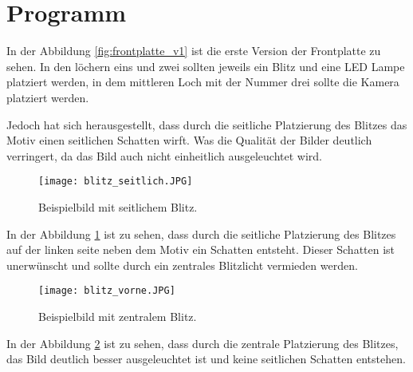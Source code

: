 \graphicspath{{images/mechanics}}

\section{Programm}

In der Abbildung \ref{fig:frontplatte_v1} ist die erste Version der Frontplatte zu sehen.
In den löchern eins und zwei sollten jeweils ein Blitz und eine LED Lampe platziert werden,
in dem mittleren Loch mit der Nummer drei sollte die Kamera platziert werden.


Jedoch hat sich herausgestellt, dass durch die seitliche Platzierung des Blitzes
das Motiv einen seitlichen Schatten wirft. Was die Qualität der Bilder deutlich verringert,
da das Bild auch nicht einheitlich ausgeleuchtet wird.

\newpage
\begin{figure}[H]
    \centering
    \texttt{[image: blitz\_seitlich.JPG]}
    \caption{Beispielbild mit seitlichem Blitz.}
    \label{fig:seitlicher_blitzt}
\end{figure}

In der Abbildung \ref{fig:seitlicher_blitzt} ist zu sehen, dass durch die seitliche Platzierung des Blitzes 
auf der linken seite neben dem Motiv ein Schatten entsteht. Dieser Schatten ist unerwünscht und sollte
durch ein zentrales Blitzlicht vermieden werden.

\begin{figure}[H]
    \centering
    \texttt{[image: blitz\_vorne.JPG]}
    \caption{Beispielbild mit zentralem Blitz.}
    \label{fig:zentraler_blitz}
\end{figure}

In der Abbildung \ref{fig:zentraler_blitz} ist zu sehen, dass durch die zentrale Platzierung des Blitzes,
das Bild deutlich besser ausgeleuchtet ist und keine seitlichen Schatten entstehen. 
